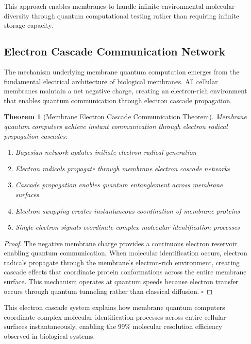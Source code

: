 \documentclass[12pt,a4paper]{article}
\newtheorem{theorem}{Theorem}
\begin{document}
This approach enables membranes to handle infinite environmental molecular diversity through quantum computational testing rather than requiring infinite storage capacity.

\subsection{Electron Cascade Communication Network}

The mechanism underlying membrane quantum computation emerges from the fundamental electrical architecture of biological membranes. All cellular membranes maintain a net negative charge, creating an electron-rich environment that enables quantum communication through electron cascade propagation.

\begin{theorem}[Membrane Electron Cascade Communication Theorem]
Membrane quantum computers achieve instant communication through electron radical propagation cascades:
\begin{enumerate}
\item Bayesian network updates initiate electron radical generation
\item Electron radicals propagate through membrane electron cascade networks  
\item Cascade propagation enables quantum entanglement across membrane surfaces
\item Electron swapping creates instantaneous coordination of membrane proteins
\item Single electron signals coordinate complex molecular identification processes
\end{enumerate}
\end{theorem}

\begin{proof}
The negative membrane charge provides a continuous electron reservoir enabling quantum communication. When molecular identification occurs, electron radicals propagate through the membrane's electron-rich environment, creating cascade effects that coordinate protein conformations across the entire membrane surface. This mechanism operates at quantum speeds because electron transfer occurs through quantum tunneling rather than classical diffusion. $\square$
\end{proof}

This electron cascade system explains how membrane quantum computers coordinate complex molecular identification processes across entire cellular surfaces instantaneously, enabling the 99\% molecular resolution efficiency observed in biological systems.
\end{document}
